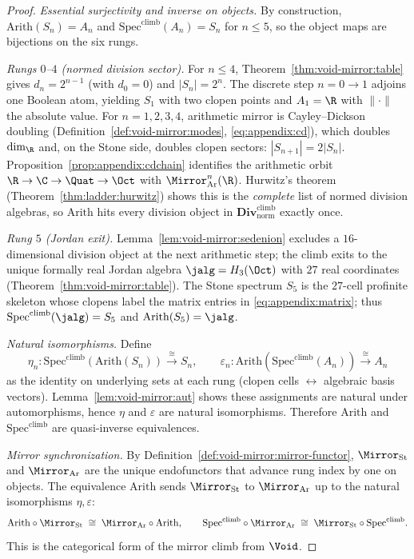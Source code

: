 \begin{proof}
\emph{Essential surjectivity and inverse on objects.} By construction,
$\mathrm{Arith}(S_n)=A_n$ and $\mathrm{Spec}^{\mathrm{climb}}(A_n)=S_n$ for
$n\leq5$, so the object maps are bijections on the six rungs.

\emph{Rungs $0$--$4$ (normed division sector).} For $n\leq4$, Theorem~\ref{thm:void-mirror:table}
gives $d_n=2^{n-1}$ (with $d_0=0$) and $|S_n|=2^n$. The discrete step
$n=0\to1$ adjoins one Boolean atom, yielding $S_1$ with two clopen points and
$A_1=\R$ with $\|\cdot\|$ the absolute value. For $n=1,2,3,4$, arithmetic
mirror is Cayley--Dickson doubling (Definition~\ref{def:void-mirror:modes},
\eqref{eq:appendix:cd}), which doubles $\dim_{\R}$ and, on the Stone side,
doubles clopen sectors: $|S_{n+1}|=2|S_n|$. Proposition~\ref{prop:appendix:cdchain}
identifies the arithmetic orbit
$\R\to\C\to\Quat\to\Oct$ with $\Mirror_{\mathrm{Ar}}^n(\R)$. Hurwitz's theorem
(Theorem~\ref{thm:ladder:hurwitz}) shows this is the \emph{complete} list of
normed division algebras, so $\mathrm{Arith}$ hits every division object in
$\mathbf{Div}^{\mathrm{climb}}_{\mathrm{norm}}$ exactly once.

\emph{Rung $5$ (Jordan exit).} Lemma~\ref{lem:void-mirror:sedenion} excludes a
$16$-dimensional division object at the next arithmetic step; the climb exits to
the unique formally real Jordan algebra $\jalg=H_3(\Oct)$ with $27$ real
coordinates (Theorem~\ref{thm:void-mirror:table}). The Stone spectrum $S_5$ is
the $27$-cell profinite skeleton whose clopens label the matrix entries in
\eqref{eq:appendix:matrix}; thus
$\mathrm{Spec}^{\mathrm{climb}}(\jalg)=S_5$ and
$\mathrm{Arith}(S_5)=\jalg$.

\emph{Natural isomorphisms.} Define
\[
  \eta_n:\mathrm{Spec}^{\mathrm{climb}}(\mathrm{Arith}(S_n))\xrightarrow{\;\cong\;}S_n,
  \qquad
  \varepsilon_n:\mathrm{Arith}(\mathrm{Spec}^{\mathrm{climb}}(A_n))\xrightarrow{\;\cong\;}A_n
\]
as the identity on underlying sets at each rung (clopen cells $\leftrightarrow$
algebraic basis vectors). Lemma~\ref{lem:void-mirror:aut} shows these assignments
are natural under automorphisms, hence $\eta$ and $\varepsilon$ are natural
isomorphisms. Therefore $\mathrm{Arith}$ and $\mathrm{Spec}^{\mathrm{climb}}$
are quasi-inverse equivalences.

\emph{Mirror synchronization.} By Definition~\ref{def:void-mirror:mirror-functor},
$\Mirror_{\mathrm{St}}$ and $\Mirror_{\mathrm{Ar}}$ are the unique endofunctors
that advance rung index by one on objects. The equivalence $\mathrm{Arith}$ sends
$\Mirror_{\mathrm{St}}$ to $\Mirror_{\mathrm{Ar}}$ up to the natural isomorphisms
$\eta,\varepsilon$:
\[
  \mathrm{Arith}\circ\Mirror_{\mathrm{St}}\;\cong\;\Mirror_{\mathrm{Ar}}\circ\mathrm{Arith},
  \qquad
  \mathrm{Spec}^{\mathrm{climb}}\circ\Mirror_{\mathrm{Ar}}\;\cong\;
  \Mirror_{\mathrm{St}}\circ\mathrm{Spec}^{\mathrm{climb}}.
\]
This is the categorical form of the mirror climb from $\Void$.
\end{proof}

